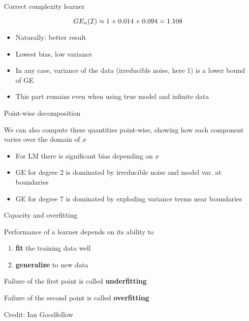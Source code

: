 \documentclass[11pt,compress,t,notes=noshow, xcolor=table]{beamer}
\begin{document}
\begin{frame}{Correct complexity learner}

\splitVThree
{}
{}
{}

\vfill

$$GE_n(\mathcal{I}) \approx 1 + 0.014 + 0.094 = 1.108 $$

\begin{itemize}
\item Naturally: better result
\item Lowest bias, low variance
\item In any case, variance of the data (irreducible noise, here 1) is a lower bound of GE
\item This part remains even when using true model and infinite data
\end{itemize}

\end{frame}

\begin{frame}{Point-wise decomposition}

We can also compute these quantities point-wise, showing how each component varies over the domain of $x$

\vfill

\splitVThree
{}
{}
{}

\vfill

\begin{itemize}
\item For LM there is significant bias depending on $x$
\item GE for degree 2 is dominated by irreducible noise and model var. at boundaries
\item GE for degree 7 is dominated by exploding variance terms near boundaries
\end{itemize}


\end{frame}

\begin{framei}[sep=L]{Capacity and overfitting}

\item Performance of a learner depends on its ability to 
\begin{enumerate}
\item \textbf{fit} the training data well
\item \textbf{generalize} to new data
\end{enumerate}  
\item Failure of the first point is called \textbf{underfitting}
\item Failure of the second point is called \textbf{overfitting}

\tiny \centering
Credit: Ian Goodfellow

\end{framei}
\end{document}
